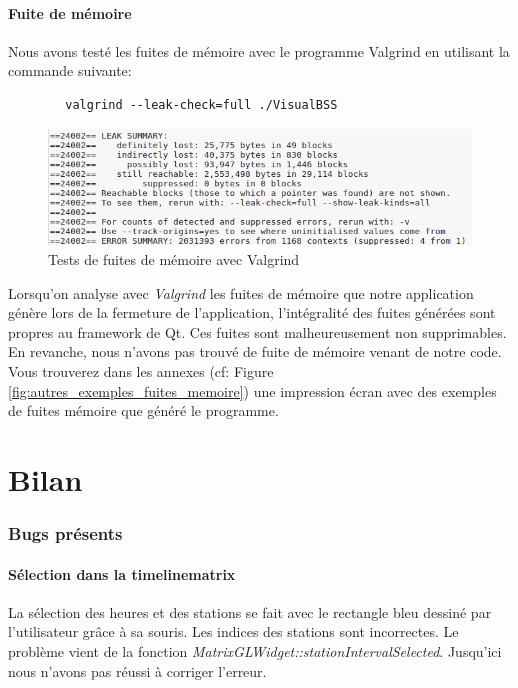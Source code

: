 \documentclass[12pt]{article}
\begin{document}
		\subsection{Fuite de mémoire}
		Nous avons testé les fuites de mémoire avec le programme Valgrind en utilisant la
		commande suivante:
	
		\begin{verbatim}	
		valgrind --leak-check=full ./VisualBSS
		\end{verbatim}
	
		\begin{figure}[!h]
		\begin{center}
		\includegraphics[scale=.8]{memory_leak.png}
		\caption{Tests de fuites de mémoire avec Valgrind}
		\end{center}
		\end{figure}	
	
		Lorsqu'on analyse avec \textit{Valgrind} les fuites de mémoire que notre application
		génère lors de la fermeture de l'application, l’intégralité des fuites
		générées sont propres au framework de Qt. Ces fuites sont malheureusement non
		supprimables.\\
		En revanche, nous n'avons pas trouvé de fuite de mémoire venant de notre code.\\
		
		Vous trouverez dans les annexes (cf: Figure \ref{fig:autres_exemples_fuites_memoire}) une
		impression écran avec des exemples de fuites mémoire que généré le programme.
	
\newpage
\part{Bilan}
	\section{Bugs présents}		
		\subsection{Sélection dans la timelinematrix}
		La sélection des heures et des stations se fait avec le rectangle bleu dessiné par
		l'utilisateur grâce à sa souris. Les indices des stations sont incorrectes.
		Le problème vient de la fonction \textit{MatrixGLWidget::stationIntervalSelected}. Jusqu'ici
		nous n'avons pas réussi à corriger l'erreur.
		
\end{document}
